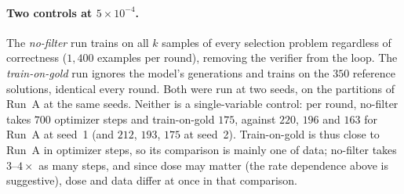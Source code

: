 \documentclass[runningheads]{llncs}
\begin{document}
\paragraph{Two controls at $5\times10^{-4}$.}
The \emph{no-filter} run trains on all $k$ samples of every selection problem
regardless of correctness ($1{,}400$ examples per round), removing the verifier
from the loop. The \emph{train-on-gold} run ignores the model's generations and
trains on the $350$ reference solutions, identical every round. Both were run at
two seeds, on the partitions of Run~A at the same seeds. Neither is a
single-variable control: per round, no-filter takes $700$ optimizer steps and
train-on-gold $175$, against $220$, $196$ and $163$ for Run~A at seed~1 (and
$212$, $193$, $175$ at seed~2). Train-on-gold is thus close to Run~A in
optimizer steps, so its comparison is mainly one of data; no-filter takes
$3$--$4\times$ as many steps, and since dose may matter (the rate dependence
above is suggestive), dose and data differ at once in that comparison.
\end{document}
